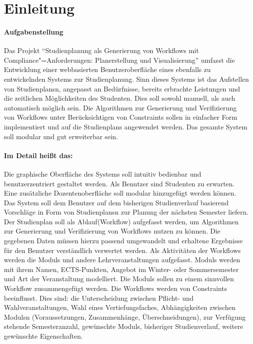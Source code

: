 \section{Einleitung}
\paragraph{Aufgabenstellung}
Das Projekt \enquote{Studienplanung als Generierung von Workflows mit Compliance"=Anforderungen: Planerstellung und Visualisierung} umfasst die Entwicklung einer webbasierten Benutzeroberfläche eines ebenfalls zu entwickelnden Systems zur Studienplanung. Sinn dieses Systems ist das Aufstellen von \glspl{Studienplan}n, angepasst an Bedürfnisse, bereits erbrachte Leistungen und die zeitlichen Möglichkeiten des Studenten. Dies soll sowohl manuell, als auch automatisch möglich sein. Die Algorithmen zur \gls{Generierung} und \gls{Verifizierung} von Workflows unter Berücksichtigen von \glspl{Constraint} sollen in einfacher Form implementiert und auf die \glspl{Studienplan} angewendet werden. Das gesamte System soll \gls{modular} und gut erweiterbar sein.\\
\paragraph{Im Detail heißt das:}
Die graphische Oberfläche des Systems soll intuitiv bedienbar und benutzerzentriert gestaltet werden. Als \gls{Benutzer} sind Studenten zu erwarten. Eine zusätzliche Dozentenoberfläche soll \gls{modular} hinzugefügt werden können. Das System soll dem \gls{Benutzer} auf dem bisherigen Studienverlauf basierend Vorschläge in Form von \glspl{Studienplan}n zur Planung der nächsten Semester liefern. Der \gls{Studienplan} soll als Ablauf(Workflow) aufgefasst werden, um Algorithmen zur \gls{Generierung} und \gls{Verifizierung} von Workflows nutzen zu können. Die gegebenen Daten müssen hierzu passend umgewandelt und erhaltene Ergebnisse für den \gls{Benutzer} verständlich verwertet werden. Als Aktivitäten der Workflows werden die \glspl{Modul} und andere Lehrveranstaltungen aufgefasst. \glspl{Modul} werden mit ihrem Namen, \gls{ECTS-Punkte}n, Angebot im Winter- oder Sommersemester und Art der Veranstaltung modelliert. Die \glspl{Modul} sollen zu einem sinnvollen Workflow zusammengefügt werden. Die Workflows werden von \gls{Constraints} beeinflusst. Dies sind: die Unterscheidung zwischen Pflicht- und Wahlveranstaltungen, Wahl eines Vertiefungsfaches, Abhängigkeiten zwischen \glspl{Modul}n (Voraussetzungen, Zusammenhänge, Überschneidungen), zur Verfügung stehende Semesteranzahl, gewünschte \glspl{Modul}, bisheriger Studienverlauf, weitere gewünschte Eigenschaften.\\